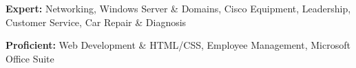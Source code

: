 \textbf{Expert:} Networking, Windows Server \& Domains, Cisco Equipment, Leadership, Customer Service, Car Repair \& Diagnosis

\spacing{}

\textbf{Proficient:} Web Development \& HTML/CSS, Employee Management, Microsoft Office Suite
